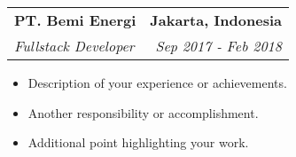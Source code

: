 \noindent
\begin{tabularx}{\textwidth}{Xr}
    \textbf{PT. Bemi Energi} & \textbf{Jakarta, Indonesia} \\
    \textit{Fullstack Developer} & \textit{Sep 2017 - Feb 2018} \\
\end{tabularx}

\vspace{.5em} %

\noindent
\begin{itemize}[left=0em, noitemsep, nolistsep]
    \item Description of your experience or achievements.
    \item Another responsibility or accomplishment.
    \item Additional point highlighting your work.
\end{itemize}

